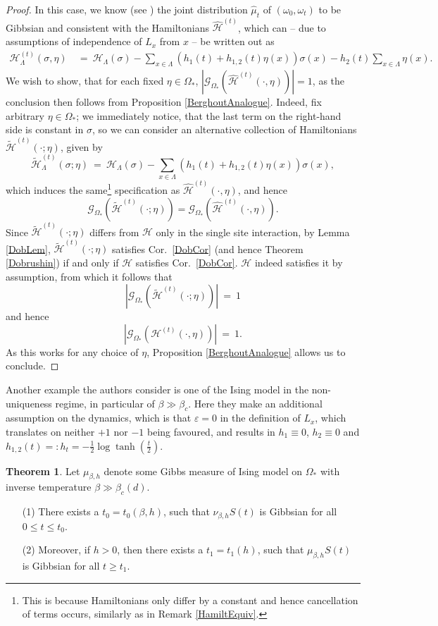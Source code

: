 \documentclass[12pt]{article}
\newcommand{\G}{\mathcal{G}}
\renewcommand{\H}{\mathcal{H}}
\newcommand{\oklepaj}[1]{\left(#1\right)}
\newcommand{\pika}{\boldsymbol{\cdot}}
\newcommand{\1}{\mathbbm{1}}
\newcommand{\5}{\vspace{0.5cm}}
\renewcommand{\tilde}{\widetilde}
\renewcommand{\hat}{\widehat}
\theoremstyle{definition}
\newtheorem{thm}{Theorem}[section]
\begin{document}
\begin{proof}
In this case, we know (see \cite{EFHR}) the joint distribution $\hat{\mu}_t$ of $(\omega_0,\omega_t)$ to be Gibbsian and consistent with the Hamiltonians $\hat{\H}^{(t)}$, which can -- due to assumptions of independence of $L_x$ from $x$ -- be written out as
\begin{align*}
\H_\Lambda^{(t)}(\sigma,\eta) ~&=~ \H_\Lambda(\sigma) - \sum_{x\in\Lambda}\oklepaj{h_1(t)+h_{1,2}(t)\eta(x)}\sigma(x) - h_2(t)\sum_{x\in\Lambda}\eta(x).
\end{align*}
We wish to show, that for each fixed $\eta\in\Omega_*$, $|\G_{\Omega_*}(\hat{\H}^{(t)}(\pika,\eta))|=1$, as the conclusion then follows from Proposition \ref{BerghoutAnalogue}. Indeed, fix arbitrary $\eta\in\Omega_*$; we immediately notice, that the last term on the right-hand side is constant in $\sigma$, so we can consider an alternative collection of Hamiltonians $\tilde{\H}^{(t)}(\pika;\eta)$, given by
$$\tilde{\H}_\Lambda^{(t)}(\sigma;\eta) ~=~ \H_\Lambda(\sigma) - \sum_{x\in\Lambda}\oklepaj{h_1(t)+h_{1,2}(t)\eta(x)}\sigma(x),$$
which induces the same\footnote{This is because Hamiltonians only differ by a constant and hence cancellation of terms occurs, similarly as in Remark \ref{HamiltEquiv}.} specification as $\hat{\H}^{(t)}(\pika,\eta)$, and hence 
$$\G_{\Omega_*}(\tilde{\H}^{(t)}(\pika;\eta))=\G_{\Omega_*}(\hat{\H}^{(t)}(\pika,\eta)).$$
Since $\tilde{\H}^{(t)}(\pika;\eta)$ differs from $\H$ only in the single site interaction, by Lemma \ref{DobLem}, $\tilde{\H}^{(t)}(\pika;\eta)$ satisfies Cor.~\ref{DobCor} (and hence Theorem \ref{Dobrushin}) if and only if $\H$ satisfies Cor.~\ref{DobCor}. $\H$ indeed satisfies it by assumption, from which it follows that 
$$|\G_{\Omega_*}(\tilde{\H}^{(t)}(\pika;\eta))|~=~1$$
and hence 
$$|\G_{\Omega_*}(\H^{(t)}(\pika,\eta))|~=~1.$$
As this works for any choice of $\eta$, Proposition \ref{BerghoutAnalogue} allows us to conclude.
\end{proof}

Another example the authors consider is one of the Ising model in the non-uniqueness regime, in particular of $\beta\gg\beta_c$. Here they make an additional assumption on the dynamics, which is that $\varepsilon=0$ in the definition of $L_x$, which translates on neither $+1$ nor $-1$ being favoured, and results in $h_1\equiv 0$, $h_2\equiv 0$ and $h_{1,2}(t)=:h_t=-\frac{1}{2}\log\tanh(\frac{t}{2})$.

\begin{thm}\label{IsingTHM}
Let $\mu_{\beta,h}$ denote some Gibbs measure of Ising model on $\Omega_*$ with inverse temperature $\beta\gg\beta_c(d)$.
\begin{itemize}
	\item[(1)] There exists a $t_0=t_0(\beta,h)$, such that $\nu_{\beta,h}S(t)$ is Gibbsian for all $0\leq t\leq t_0$.
	\item[(2)] Moreover, if $h>0$, then there exists a $t_1=t_1(h)$, such that $\mu_{\beta,h}S(t)$ is Gibbsian for all $t\geq t_1$.
\end{itemize} 
\end{thm}
\end{document}

